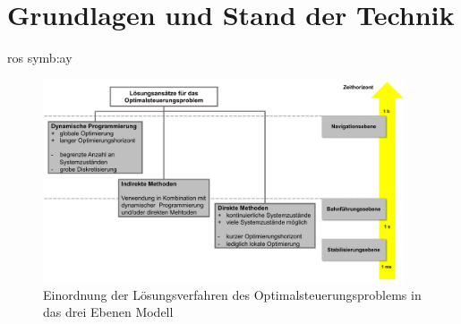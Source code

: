\chapter{Grundlagen und Stand der Technik}
\thispagestyle{ika}
\gls{ros} \gls{symb:ay}
\begin{figure}[H]
	\flushleft
	\includegraphics[width=0.95\textwidth]{content/fig/2_SdT/Einordnung_Planungsalgorithmen.pdf}
	\caption{Einordnung der Lösungsverfahren des Optimalsteuerungsproblems in das drei Ebenen Modell \cite{Donges.1982,Werling.2017}}
	\label{fig:EinordnungPlanungsalgorithmen}
\end{figure}